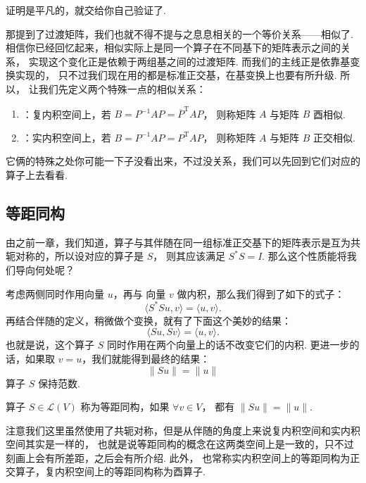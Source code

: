 证明是平凡的，就交给你自己验证了. 

那提到了过渡矩阵，我们也就不得不提与之息息相关的一个等价关系——相似了. 
相信你已经回忆起来，相似实际上是同一个算子在不同基下的矩阵表示之间的关系，
实现这个变化正是依赖于两组基之间的过渡矩阵. 而我们的主线正是依靠基变换实现的，
只不过我们现在用的都是标准正交基，在基变换上也要有所升级. 所以，
让我们先定义两个特殊一点的相似关系：

\begin{definition}
    \begin{enumerate}

        \item {}：复内积空间上，若 $ B = P^{-1}AP = \overline{P}^{\mathrm{T}}AP $，
        则称矩阵 $ A $ 与矩阵 $ B $ 酉相似. 

        \item {}：实内积空间上，若 $ B = P^{-1}AP = {P}^{\mathrm{T}}AP $，
        则称矩阵 $ A $ 与矩阵 $ B $ 正交相似. 
    \end{enumerate}
\end{definition}

它俩的特殊之处你可能一下子没看出来，不过没关系，我们可以先回到它们对应的算子上去看看. 

\subsection{等距同构}

由之前一章，我们知道，算子与其伴随在同一组标准正交基下的矩阵表示是互为共轭对称的，所以设对应的算子是 $ S $，
则其应该满足 $ S^*S = I $. 那么这个性质能将我们导向何处呢？

考虑两侧同时作用向量 $ u $，再与 向量 $ v $ 做内积，那么我们得到了如下的式子：
\[ \langle S^*Su, v \rangle = \langle u, v \rangle. \]
再结合伴随的定义，稍微做个变换，就有了下面这个美妙的结果：
\[ \langle Su, Sv \rangle = \langle u, v \rangle. \]
也就是说，这个算子 $ S $ 同时作用在两个向量上的话不改变它们的内积. 
更进一步的话，如果取 $ v = u $，我们就能得到最终的结果：
\[ \lVert Su \rVert = \lVert u \rVert \]
算子 $ S $ 保持范数. 

\begin{definition}
     算子 $ S \in \mathcal{L}(V) $ 称为等距同构，如果 $ \forall v \in V $，
    都有 $ \lVert Su \rVert = \lVert u \rVert $.  
\end{definition}

注意我们这里虽然使用了共轭对称，但是从伴随的角度上来说复内积空间和实内积空间其实是一样的，
也就是说等距同构的概念在这两类空间上是一致的，只不过刻画上会有所差距，之后会有所介绍. 此外，
也常称实内积空间上的等距同构为正交算子，复内积空间上的等距同构称为酉算子. 

